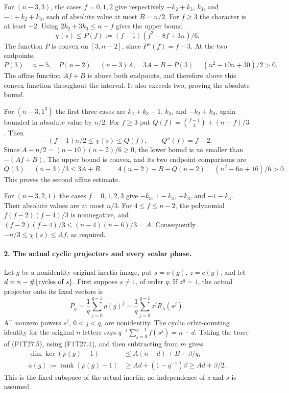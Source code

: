 For $(n-3,3)$, the cases $f=0,1,2$ give respectively
$-k_2+k_3$, $k_3$, and $-1+k_2+k_3$, each of absolute
value at most $B=n/2$. For $f\ge3$ the character is
at least $-2$. Using $2k_2+3k_3\le n-f$ gives the upper
bound
\[
 \chi(s)\le P(f):=(f-1)(f^2-8f+3n)/6.
\]
The function $P$ is convex on $[3,n-2]$, since
$P''(f)=f-3$. At the two endpoints,
\[
 P(3)=n-5,\quad P(n-2)=(n-3)A,\quad
 3A+B-P(3)=(n^2-10n+30)/2>0.
\]
The affine function $Af+B$ is above both endpoints,
and therefore above this convex function throughout the
interval. It also exceeds two, proving the absolute bound.

For $(n-3,1^3)$ the first three cases are
$k_2+k_3-1$, $k_3$, and $-k_2+k_3$, again bounded
in absolute value by $n/2$. For $f\ge3$ put
$Q(f)=\binom{f-1}3+(n-f)/3$. Then
\[
 -(f-1)n/2\le\chi(s)\le Q(f),\qquad Q''(f)=f-2.
\]
Since $A-n/2=(n-10)(n-2)/6\ge0$, the lower bound
is no smaller than $-(Af+B)$. The upper bound is convex,
and its two endpoint comparisons are
\[
 Q(3)=(n-3)/3\le3A+B,\qquad
 A(n-2)+B-Q(n-2)=(n^2-6n+16)/6>0.
\]
This proves the second affine estimate.

For $(n-3,2,1)$ the cases $f=0,1,2,3$ give
$-k_3$, $1-k_3$, $-k_3$, and $-1-k_3$.
Their absolute values are at most $n/3$.
For $4\le f\le n-2$, the polynomial
$f(f-2)(f-4)/3$ is nonnegative, and
$(f-2)(f-4)/3\le(n-4)(n-6)/3=A$.
Consequently $-n/3\le\chi(s)\le Af$, as required.

\paragraph{2. The actual cyclic projectors and every scalar phase.}
Let $g$ be a nonidentity original inertia image, put
$s=\sigma(g)$, $z=c(g)$, and let
$d=n-\#\{\hbox{cycles of }s\}$.
First suppose $s\ne1$, of order $q$.
If $z^q=1$, the actual projector onto its fixed vectors is
\[
  P_g=\frac1q\sum_{j=0}^{q-1}\rho(g)^j
      =\frac1q\sum_{j=0}^{q-1}z^jR_\lambda(s^j).
 \tag{F1T27.5}
\]
All nonzero powers $s^j$, $0<j<q$, are nonidentity.
The cyclic orbit-counting identity for the original
$n$ letters says
$q^{-1}\sum_{j=0}^{q-1}f(s^j)=n-d$.
Taking the trace of (F1T27.5), using (F1T27.4), and
then subtracting from $m$ gives
\[
\begin{split}
 \dim\ker(\rho(g)-1)&\le A(n-d)+B+\beta/q,\\
 a(g):=\operatorname{rank}(\rho(g)-1)
     &\ge Ad+(1-q^{-1})\beta
      \ge Ad+\beta/2.
\end{split}
 \tag{F1T27.6}
\]
This is the fixed subspace of the actual inertia; no
independence of $z$ and $s$ is assumed.

